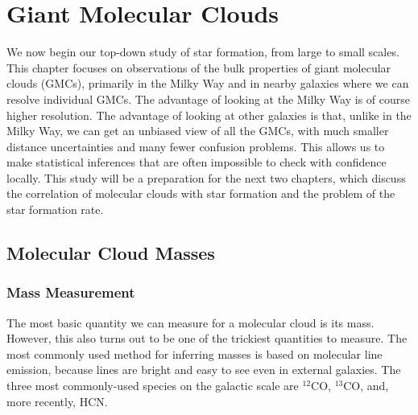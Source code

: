 \chapter{Giant Molecular Clouds}
\label{ch:gmcs}


We now begin our top-down study of star formation, from large to small scales. This chapter focuses on observations of the bulk properties of giant molecular clouds (GMCs), primarily in the Milky Way and in nearby galaxies where we can resolve individual GMCs. The advantage of looking at the Milky Way is of course higher resolution. The advantage of looking at other galaxies is that, unlike in the Milky Way, we can get an unbiased view of all the GMCs, with much smaller distance uncertainties and many fewer confusion problems. This allows us to make statistical inferences that are often impossible to check with confidence locally. This study will be a preparation for the next two chapters, which discuss the correlation of molecular clouds with star formation and the problem of the star formation rate.

\section{Molecular Cloud Masses}

\subsection{Mass Measurement}

The most basic quantity we can measure for a molecular cloud is its mass. However, this also turns out to be one of the trickiest quantities to measure. The most commonly used method for inferring masses is based on molecular line emission, because lines are bright and easy to see even in external galaxies. The three most commonly-used species on the galactic scale are $^{12}$CO, $^{13}$CO, and, more recently, HCN.

